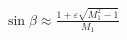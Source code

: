 \documentclass[10pt]{article}
\begin{document}
\begin{align*}\sin \beta \approx \frac{1 + \varepsilon \sqrt{M_{1}^{2} - 1} }{M_{1}}\end{align*}
\end{document}
